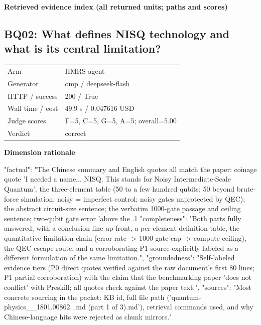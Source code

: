 \documentclass[10pt]{article}
\begin{document}
\textbf{Retrieved evidence index (all returned units; paths and scores) }
\begin{EvidenceText}
\end{EvidenceText}
\subsection{BQ02: What defines NISQ technology and what is its central limitation?}
\begin{tabular}{@{}ll@{}}
Arm & HMRS agent\\
Generator & omp / deepseek-flash\\
HTTP / success & 200 / True\\
Wall time / cost & 49.9 s / 0.047616 USD\\
Judge scores & F=5, C=5, G=5, A=5; overall=5.00\\
Verdict & correct\\
\end{tabular}

\textbf{Dimension rationale}
\begin{EvidenceText}
{
  "factual": "The Chinese summary and English quotes all match the paper: coinage quote 'I needed a name... NISQ. This stands for Noisy Intermediate-Scale Quantum'; the three-element table (50 to a few hundred qubits; 50 beyond brute-force simulation; noisy = imperfect control; noisy gates unprotected by QEC); the abstract circuit-size sentence; the verbatim 1000-gate passage and ceiling sentence; two-qubit gate error 'above the .1%
  "completeness": "Both parts fully answered, with a conclusion line up front, a per-element definition table, the quantitative limitation chain (error rate -> 1000-gate cap -> compute ceiling), the QEC escape route, and a corroborating P1 source explicitly labeled as a different formulation of the same limitation.",
  "groundedness": "Self-labeled evidence tiers (P0 direct quotes verified against the raw document's first 80 lines; P1 partial corroboration) with the claim that the benchmarking paper 'does not conflict' with Preskill; all quotes check against the paper text.",
  "sources": "Most concrete sourcing in the packet: KB id, full file path ('quantum-physics__1801.00862...md (part 1 of 3).md'), retrieval commands used, and why Chinese-language hits were rejected as chunk mirrors."
}
\end{EvidenceText}
\end{document}
